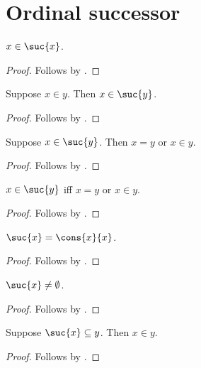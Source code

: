 


\section{Ordinal successor}

\begin{proposition}\label{suc_intro_self}
    $x\in\suc{x}$.
\end{proposition}
\begin{proof}
    Follows by .
\end{proof}

\begin{proposition}\label{suc_intro_in}
    Suppose $x\in y$. Then $x\in\suc{y}$.
\end{proposition}
\begin{proof}
    Follows by .
\end{proof}

\begin{proposition}\label{suc_elim}
    Suppose $x\in\suc{y}$.
    Then $x = y$ or $x\in y$.
\end{proposition}
\begin{proof}
    Follows by .
\end{proof}

\begin{proposition}\label{suc_iff}
    $x\in\suc{y}$ iff $x = y$ or $x\in y$.
\end{proposition}
\begin{proof}
    Follows by .
\end{proof}

\begin{proposition}\label{suc_eq_cons}
    $\suc{x}=\cons{x}{x}$.
\end{proposition}
\begin{proof}
    Follows by .
\end{proof}

\begin{proposition}\label{suc_neq_emptyset}
    $\suc{x}\neq \emptyset$.
\end{proposition}
\begin{proof}
    Follows by .
\end{proof}

\begin{proposition}\label{suc_subseteq_implies_in}
    Suppose $\suc{x}\subseteq y$. Then $x\in y$.
\end{proposition}
\begin{proof}
    Follows by .
\end{proof}


